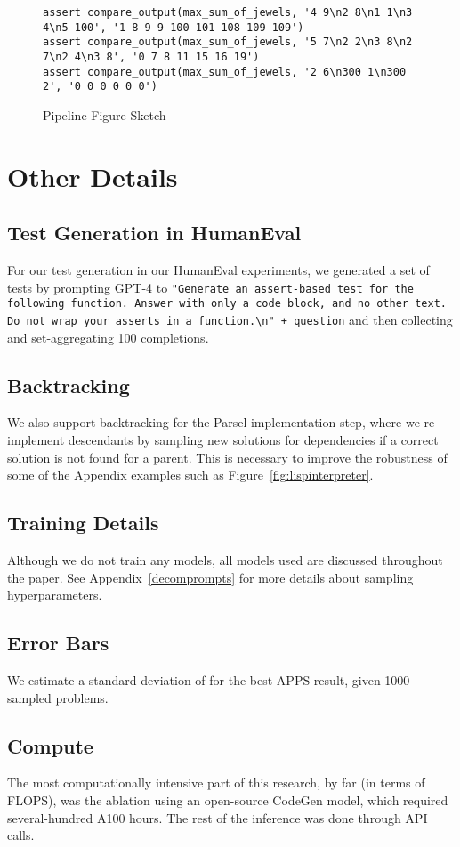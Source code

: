 \begin{figure*}
\begin{lstlisting}
assert compare_output(max_sum_of_jewels, '4 9\n2 8\n1 1\n3 4\n5 100', '1 8 9 9 100 101 108 109 109')
assert compare_output(max_sum_of_jewels, '5 7\n2 2\n3 8\n2 7\n2 4\n3 8', '0 7 8 11 15 16 19')
assert compare_output(max_sum_of_jewels, '2 6\n300 1\n300 2', '0 0 0 0 0 0')
\end{lstlisting}

\caption{Pipeline Figure Sketch}
\end{figure*}

\clearpage
\newpage

\section{Other Details}
\subsection{Test Generation in HumanEval}
For our test generation in our HumanEval experiments, we generated a set of tests by prompting GPT-4 to \lstinline{"Generate an assert-based test for the following function. Answer with only a code block, and no other text. Do not wrap your asserts in a function.\n" + question} and then collecting and set-aggregating 100 completions.

\subsection{Backtracking}
We also support backtracking for the Parsel implementation step, where we re-implement descendants by sampling new solutions for dependencies if a correct solution is not found for a parent. This is necessary to improve the robustness of some of the Appendix examples such as Figure~\ref{fig:lispinterpreter}.

\subsection{Training Details}
Although we do not train any models, all models used are discussed throughout the paper. See Appendix~\ref{decomprompts} for more details about sampling hyperparameters.
\subsection{Error Bars}
We estimate a standard deviation of  for the best APPS result, given 1000 sampled problems. 
\subsection{Compute}
The most computationally intensive part of this research, by far (in terms of FLOPS), was the ablation using an open-source CodeGen model, which required several-hundred A100 hours. The rest of the inference was done through API calls.

